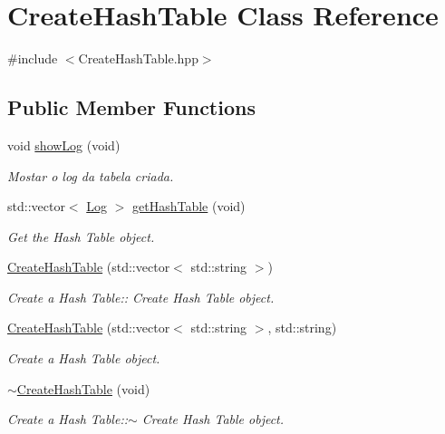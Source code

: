 \hypertarget{class_create_hash_table}{}\section{Create\+Hash\+Table Class Reference}
\label{class_create_hash_table}


{\ttfamily \#include $<$Create\+Hash\+Table.\+hpp$>$}

\subsection*{Public Member Functions}
\begin{DoxyCompactItemize}
\item 
void \hyperlink{class_create_hash_table_ab50343628947f7064f4ab646a834ef03}{show\+Log} (void)
\begin{DoxyCompactList}\small\item\em Mostar o log da tabela criada. \end{DoxyCompactList}\item 
std\+::vector$<$ \hyperlink{class_log}{Log} $>$ \hyperlink{class_create_hash_table_a9e01964c0d11a330bfce92c77fad0ca5}{get\+Hash\+Table} (void)
\begin{DoxyCompactList}\small\item\em Get the Hash Table object. \end{DoxyCompactList}\item 
\hyperlink{class_create_hash_table_a9cc25111eb98da7c68ff4dcff9cdd4ea}{Create\+Hash\+Table} (std\+::vector$<$ std\+::string $>$)
\begin{DoxyCompactList}\small\item\em Create a Hash Table\+:\+: Create Hash Table object. \end{DoxyCompactList}\item 
\hyperlink{class_create_hash_table_a3aac5164fee71508dbd12eaa4c81ab44}{Create\+Hash\+Table} (std\+::vector$<$ std\+::string $>$, std\+::string)
\begin{DoxyCompactList}\small\item\em Create a Hash Table object. \end{DoxyCompactList}\item 
\hyperlink{class_create_hash_table_abf22158361dd73d04edf1739ef6b3482}{$\sim$\+Create\+Hash\+Table} (void)
\begin{DoxyCompactList}\small\item\em Create a Hash Table\+:\+:$\sim$ Create Hash Table object. \end{DoxyCompactList}\end{DoxyCompactItemize}


